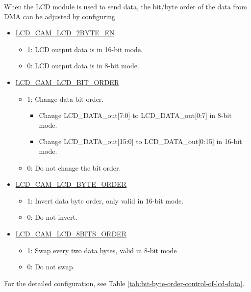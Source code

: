 \documentclass[main\_\_EN.tex]{subfiles}
\begin{document}
When the LCD module is used to send data, the bit/byte order of the data from DMA can be adjusted by configuring

\begin{itemize}
    \item \hyperref[fielddesc:LCDCAMLCD2BYTEEN]{LCD\_CAM\_LCD\_2BYTE\_EN}
    \begin{itemize}
        \item 1: LCD output data is in 16-bit mode.
        \item 0: LCD output data is in 8-bit mode.
    \end{itemize}
    \item \hyperref[fielddesc:LCDCAMLCDBITORDER]{LCD\_CAM\_LCD\_BIT\_ORDER}
    \begin{itemize}
        \item 1: Change data bit order.
        \begin{itemize}
            \item Change LCD\_DATA\_out[7:0] to LCD\_DATA\_out[0:7] in 8-bit mode.
            \item Change LCD\_DATA\_out[15:0] to LCD\_DATA\_out[0:15] in 16-bit mode.
        \end{itemize}
        \item 0: Do not change the bit order.
    \end{itemize}
    \item \hyperref[fielddesc:LCDCAMLCDBYTEORDER]{LCD\_CAM\_LCD\_BYTE\_ORDER}
    \begin{itemize}
        \item 1: Invert data byte order, only valid in 16-bit mode.
        \item 0: Do not invert.
    \end{itemize}
    \item \hyperref[fielddesc:LCDCAMLCD8BITSORDER]{LCD\_CAM\_LCD\_8BITS\_ORDER}
    \begin{itemize}
        \item 1: Swap every two data bytes, valid in 8-bit mode
        \item 0: Do not swap.
    \end{itemize}
\end{itemize}
For the detailed configuration, see Table \ref{tab:bit-byte-order-control-of-lcd-data}.
\end{document}
